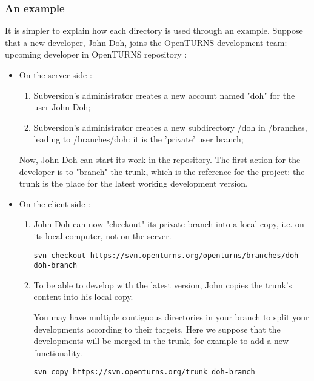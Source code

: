 \subsubsection{An example}

It is simpler to explain how each directory is used through an example. Suppose that a new developer, John Doh, joins the OpenTURNS development team:
upcoming developer in OpenTURNS repository :
\begin{itemize}
\item On the server side :

\begin{enumerate}
\item Subversion's administrator creates a new account named "doh" for the user John Doh;
\item Subversion's administrator creates a new subdirectory /doh in /branches, leading to /branches/doh: it is the 'private' user branch;
\end{enumerate}

Now, John Doh can start its work in the repository. The first action for the developer is to "branch" the trunk, which is the reference for the project: the trunk is the place for the latest working development version.

\item On the client side :

\begin{enumerate}

\item John Doh can now "checkout" its private branch into a local copy, i.e. on its local computer, not on the server.

\begin{lstlisting}
svn checkout https://svn.openturns.org/openturns/branches/doh doh-branch
\end{lstlisting}

\item To be able to develop with the latest version, John copies the trunk's content into his local copy.

You may have multiple contiguous directories in your branch to split your developments according to their targets.
Here we suppose that the developments will be merged in the trunk, for example to add a new functionality.

\begin{lstlisting}
svn copy https://svn.openturns.org/trunk doh-branch
\end{lstlisting}


\end{enumerate}
\end{itemize}
